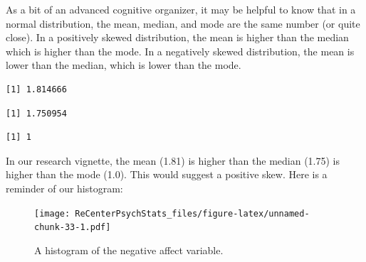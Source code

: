 \documentclass[
  11pt,
]{book}
\newenvironment{Shaded}{\begin{snugshade}}{\end{snugshade}}
\newcommand{\AttributeTok}[1]{\textcolor[rgb]{0.77,0.63,0.00}{#1}}
\newcommand{\ConstantTok}[1]{\textcolor[rgb]{0.00,0.00,0.00}{#1}}
\newcommand{\FunctionTok}[1]{\textcolor[rgb]{0.00,0.00,0.00}{#1}}
\newcommand{\NormalTok}[1]{#1}
\newcommand{\SpecialCharTok}[1]{\textcolor[rgb]{0.00,0.00,0.00}{#1}}
\begin{document}
As a bit of an advanced cognitive organizer, it may be helpful to know that in a normal distribution, the mean, median, and mode are the same number (or quite close). In a positively skewed distribution, the mean is higher than the median which is higher than the mode. In a negatively skewed distribution, the mean is lower than the median, which is lower than the mode.

\begin{Shaded}
\end{Shaded}

\begin{verbatim}
[1] 1.814666
\end{verbatim}

\begin{Shaded}
\end{Shaded}

\begin{verbatim}
[1] 1.750954
\end{verbatim}

\begin{Shaded}
\end{Shaded}

\begin{verbatim}
[1] 1
\end{verbatim}

In our research vignette, the mean (1.81) is higher than the median (1.75) is higher than the mode (1.0). This would suggest a positive skew. Here is a reminder of our histogram:

\begin{figure}
\centering
\texttt{[image: ReCenterPsychStats\_files/figure-latex/unnamed-chunk-33-1.pdf]}
\caption{\label{fig:unnamed-chunk-33}A histogram of the negative affect variable.}
\end{figure}
\end{document}
